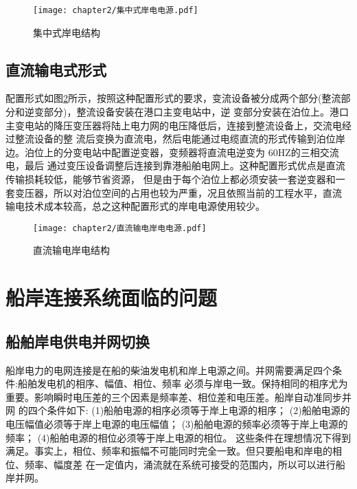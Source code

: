 \begin{figure}[!htp]
	\centering
	\texttt{[image: chapter2/集中式岸电电源.pdf]}
	\caption{集中式岸电结构}
	\label{fig:集中式岸电结构}
\end{figure}

\subsection{直流输电式形式}

配置形式如图\ref{fig:直流输电岸电结构}所示，按照这种配置形式的要求，变流设备被分成两个部分(整流部分和逆变部分)，整流设备安装在港口主变电站中，逆
变部分安装在泊位上。港口主变电站的降压变压器将陆上电力网的电压降低后，连接到整流设备上，交流电经过整流设备的整
流后变换为直流电，然后电能通过电缆直流的形式传输到泊位岸边。泊位上的分变电站中配置逆变器，变频器将直流电逆变为
60HZ的三相交流电，最后 通过变压设备调整后连接到靠港船舶电网上。这种配置形式优点是直流传输损耗较低，能够节省资源，
但是由于每个泊位上都必须安装一套逆变器和一套变压器，所以对泊位空间的占用也较为严重，况且依照当前的工程水平，直流
输电技术成本较高，总之这种配置形式的岸电电源使用较少。

\begin{figure}[!htp]
	\centering
	\texttt{[image: chapter2/直流输电岸电电源.pdf]}
	\caption{直流输电岸电结构}
	\label{fig:直流输电岸电结构}
\end{figure}

\section{船岸连接系统面临的问题}
\subsection{船舶岸电供电并网切换}
船岸电力的电网连接是在船的柴油发电机和岸上电源之间。并网需要满足四个条件:船舶发电机的相序、幅值、相位、频率
必须与岸电一致。保持相同的相序尤为重要。影响瞬时电压差的三个因素是频率差、相位差和电压差。船岸自动准同步并网
的四个条件如下:
(1)船舶电源的相序必须等于岸上电源的相序；
(2)船舶电源的电压幅值必须等于岸上电源的电压幅值；
(3)船舶电源的频率必须等于岸上电源的频率；
(4)船舶电源的相位必须等于岸上电源的相位。
这些条件在理想情况下得到满足。事实上，相位、频率和振幅不可能同时完全一致。但只要船电和岸电的相位、频率、幅度差
在一定值内，涌流就在系统可接受的范围内，所以可以进行船岸并网。

